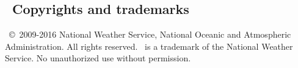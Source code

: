 \vssub
\subsection{~Copyrights and trademarks}
\vssub

\ww\ \copyright\ 2009-2016 National Weather Service, National Oceanic and
Atmospheric Administration.  All rights reserved. \ww\ is a trademark of the
National Weather Service. No unauthorized use without permission.